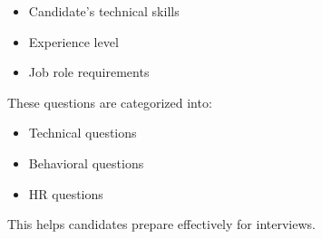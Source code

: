 \begin{itemize}
\item Candidate’s technical skills
\item Experience level
\item Job role requirements
\end{itemize}

These questions are categorized into:
\begin{itemize}
\item Technical questions
\item Behavioral questions
\item HR questions
\end{itemize}
This helps candidates prepare effectively for interviews.
\label{LastPage}


